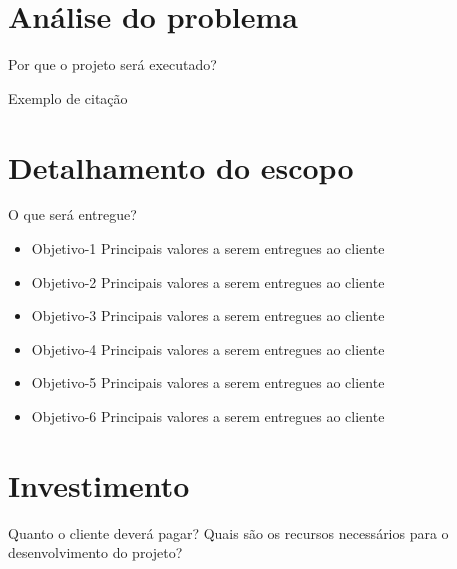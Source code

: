 \documentclass[letterpaper, 10 pt, conference]{ieeeconf}  %
\begin{document}
\section{Análise do problema}

Por que o projeto será executado?

Exemplo de citação \cite{c2}


\section{Detalhamento do escopo}

O que será entregue?

\begin{itemize}

\item{Objetivo-1} Principais valores a serem entregues ao cliente \cite{c1}

\item{Objetivo-2} Principais valores a serem entregues ao cliente 

\item{Objetivo-3} Principais valores a serem entregues ao cliente  

\item{Objetivo-4} Principais valores a serem entregues ao cliente

\item{Objetivo-5} Principais valores a serem entregues ao cliente

\item{Objetivo-6} Principais valores a serem entregues ao cliente

\end{itemize}

\section{Investimento}

Quanto o cliente deverá pagar?
Quais são os recursos necessários para o desenvolvimento do projeto?

 
 

\addtolength{\textheight}{-12cm}   %
\end{document}
